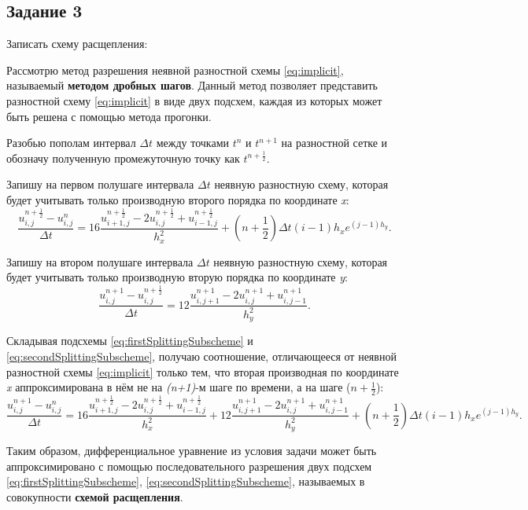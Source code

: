 \documentclass[12pt, a4paper]{report}
\begin{document}
	\subsection*{Задание 3}
	\large
	Записать схему расщепления: \par
	Рассмотрю метод разрешения неявной разностной схемы \eqref{eq:implicit}, называемый \textbf{методом дробных шагов}. Данный метод позволяет представить разностной схему \eqref{eq:implicit} в виде двух подсхем, каждая из которых может быть решена с помощью метода прогонки. \par
	Разобью пополам интервал $\Delta t$ между точками $t^{n}$ и $t^{n+1}$ на разностной сетке и обозначу полученную промежуточную точку как $t^{n+\frac{1}{2}}$. \par
	Запишу на первом полушаге интервала $\Delta t$ неявную разностную схему, которая будет учитывать только производную второго порядка по координате \textit{x}:
	\small
	\begin{equation}\label{eq:firstSplittingSubscheme}
		\frac{u_{i, j}^{n+\frac{1}{2}} - u_{i, j}^{n}}{\Delta t} = 16\frac{u_{i+1, j}^{n+\frac{1}{2}} - 2u_{i, j}^{n+\frac{1}{2}} + u_{i-1, j}^{n+\frac{1}{2}}}{h_{x}^{2}} + (n + \frac{1}{2})\Delta t(i-1)h_{x}e^{(j-1)h_{y}}.
	\end{equation}
	\par
	\large
	Запишу на втором полушаге интервала $\Delta t$ неявную разностную схему, которая будет учитывать только производную вторую порядка по координате \textit{y}:
	\begin{equation}\label{eq:secondSplittingSubscheme}
		\frac{u_{i, j}^{n+1} - u_{i, j}^{n+\frac{1}{2}}}{\Delta t} = 12\frac{u_{i, j+1}^{n+1} - 2u_{i, j}^{n+1} + u_{i, j-1}^{n+1}}{h_{y}^{2}}.
	\end{equation}
	\par
	Складывая подсхемы \eqref{eq:firstSplittingSubscheme} и \eqref{eq:secondSplittingSubscheme}, получаю соотношение, отличающееся от неявной разностной схемы \eqref{eq:implicit} только тем, что вторая производная по координате \textit{x} аппроксимирована в нём не на \textit{(n+1)}-м шаге по времени, а на шаге ($n+\frac{1}{2}$):
	\small
	\begin{equation}\label{eq:splittingScheme}
		\frac{u_{i, j}^{n+1} - u_{i, j}^{n}}{\Delta t} = 16\frac{u_{i+1, j}^{n+\frac{1}{2}} - 2u_{i, j}^{n+\frac{1}{2}} + u_{i-1, j}^{n+\frac{1}{2}}}{h_{x}^{2}} + 12\frac{u_{i, j+1}^{n+1} - 2u_{i, j}^{n+1} + u_{i, j-1}^{n+1}}{h_{y}^{2}} + (n + \frac{1}{2})\Delta t(i-1)h_{x}e^{(j-1)h_{y}}.
	\end{equation}
	\par
	\large
	Таким образом, дифференциальное уравнение из условия задачи может быть аппроксимировано с помощью последовательного разрешения двух подсхем \eqref{eq:firstSplittingSubscheme}, \eqref{eq:secondSplittingSubscheme}, называемых в совокупности \textbf{схемой расщепления}.
\end{document}
